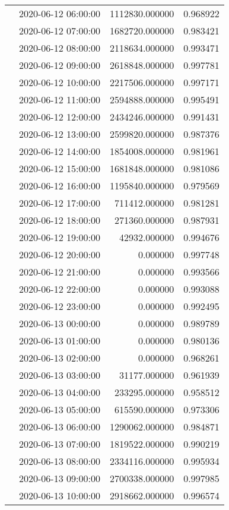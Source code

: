 \begin{tabular}{llrr}
 & 2020-06-12 06:00:00 & 1112830.000000 & 0.968922 \\
 & 2020-06-12 07:00:00 & 1682720.000000 & 0.983421 \\
 & 2020-06-12 08:00:00 & 2118634.000000 & 0.993471 \\
 & 2020-06-12 09:00:00 & 2618848.000000 & 0.997781 \\
 & 2020-06-12 10:00:00 & 2217506.000000 & 0.997171 \\
 & 2020-06-12 11:00:00 & 2594888.000000 & 0.995491 \\
 & 2020-06-12 12:00:00 & 2434246.000000 & 0.991431 \\
 & 2020-06-12 13:00:00 & 2599820.000000 & 0.987376 \\
 & 2020-06-12 14:00:00 & 1854008.000000 & 0.981961 \\
 & 2020-06-12 15:00:00 & 1681848.000000 & 0.981086 \\
 & 2020-06-12 16:00:00 & 1195840.000000 & 0.979569 \\
 & 2020-06-12 17:00:00 & 711412.000000 & 0.981281 \\
 & 2020-06-12 18:00:00 & 271360.000000 & 0.987931 \\
 & 2020-06-12 19:00:00 & 42932.000000 & 0.994676 \\
 & 2020-06-12 20:00:00 & 0.000000 & 0.997748 \\
 & 2020-06-12 21:00:00 & 0.000000 & 0.993566 \\
 & 2020-06-12 22:00:00 & 0.000000 & 0.993088 \\
 & 2020-06-12 23:00:00 & 0.000000 & 0.992495 \\
 & 2020-06-13 00:00:00 & 0.000000 & 0.989789 \\
 & 2020-06-13 01:00:00 & 0.000000 & 0.980136 \\
 & 2020-06-13 02:00:00 & 0.000000 & 0.968261 \\
 & 2020-06-13 03:00:00 & 31177.000000 & 0.961939 \\
 & 2020-06-13 04:00:00 & 233295.000000 & 0.958512 \\
 & 2020-06-13 05:00:00 & 615590.000000 & 0.973306 \\
 & 2020-06-13 06:00:00 & 1290062.000000 & 0.984871 \\
 & 2020-06-13 07:00:00 & 1819522.000000 & 0.990219 \\
 & 2020-06-13 08:00:00 & 2334116.000000 & 0.995934 \\
 & 2020-06-13 09:00:00 & 2700338.000000 & 0.997985 \\
 & 2020-06-13 10:00:00 & 2918662.000000 & 0.996574 \\

\end{tabular}
